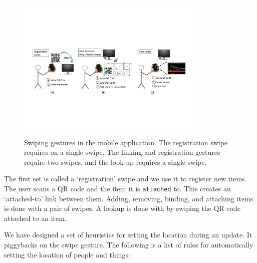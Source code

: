 \begin{figure}[htb!]
\begin{center}
\includegraphics[width=0.8\textwidth]{figs/swipes}
\caption{Swiping gestures in the mobile application.  The registration swipe requires on a single swipe.  The 
linking and registration gestures require two swipes, and the look-up requires a single swipe.}
\label{fig:swipes}
\end{center}
\end{figure}

The first set is called a `registration' swipe and we use it to register new items.  The user scans a QR code and the item it is \texttt{attached}
to.  This creates an `attached-to' link between them.  Adding, removing, binding, and attaching items is done with a pair of swipes.
A lookup is done with by swiping the QR code attached to an item.

We have designed a set of heuristics for setting the location during an update.  It piggybacks on the swipe gesture.
The following is a list of rules for automatically setting the location of people and things:

